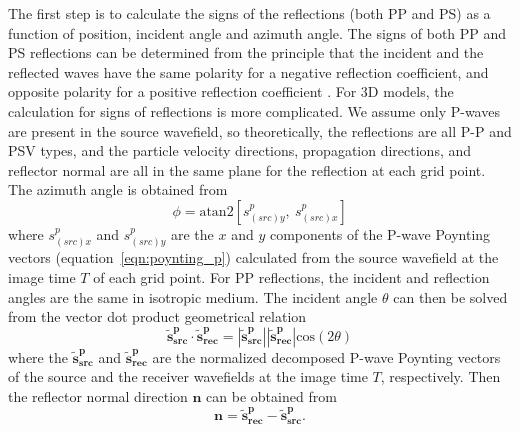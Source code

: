 \documentclass[manuscript,ulem,graphix,revised]{geophysics}
\begin{document}
The first step is to calculate the signs of the reflections (both PP and PS) as a function of position, incident angle and azimuth angle.
The signs of both PP and PS reflections can be determined from the principle that the incident and the reflected waves have the same polarity for a negative reflection coefficient, and opposite polarity for a positive reflection coefficient \citep{aki80}. For 3D models, the calculation for signs of reflections is more complicated. 
We assume only P-waves are present in the source wavefield, so theoretically, the reflections are all P-P and PSV types, and the particle velocity directions, propagation directions, and reflector normal are all in the same plane for the reflection at each grid point. The azimuth angle is obtained from 
\begin{equation}
\phi=\mathrm{atan2}[s^{p}_{(src)y},\ s^{p}_{(src)x}]
\label{eqn:azm_agl}
\end{equation}
where $s^{p}_{(src)x}$ and $s^{p}_{(src)y}$ are the $x$ and $y$ components of the P-wave Poynting vectors (equation~\ref{eqn:poynting_p}) calculated from the source wavefield at the image time $T$ of each grid point. For PP reflections, the incident and reflection angles are the same in isotropic medium. The incident angle $\theta$ can then be solved from the vector dot product geometrical relation 
\begin{equation}
\mathbf{\tilde{s}^{p}_{src}}\cdot \mathbf{\tilde{s}^p_{rec}}=|\mathbf{\tilde{s}^{p}_{src}}||\mathbf{\tilde{s}^p_{rec}}|\mathrm{cos}(2\theta)
\label{eqn:inc_agl}
\end{equation}
where the $\mathbf{\tilde{s}^{p}_{src}}$ and $\mathbf{\tilde{s}^p_{rec}}$ are the normalized decomposed P-wave Poynting vectors of the source and the receiver wavefields at the image time $T$, respectively. Then the reflector normal direction $\mathbf{n}$ can be obtained from
\begin{equation}
\mathbf{n}=\mathbf{\tilde{s}^p_{rec}}-\mathbf{\tilde{s}^{p}_{src}}.
\end{equation}
\end{document}
